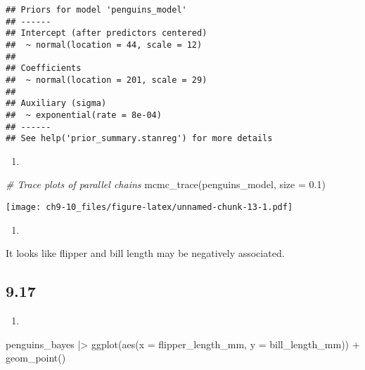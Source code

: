 \documentclass[
]{article}
\newenvironment{Shaded}{\begin{snugshade}}{\end{snugshade}}
\newcommand{\AttributeTok}[1]{\textcolor[rgb]{0.77,0.63,0.00}{#1}}
\newcommand{\CommentTok}[1]{\textcolor[rgb]{0.56,0.35,0.01}{\textit{#1}}}
\newcommand{\FloatTok}[1]{\textcolor[rgb]{0.00,0.00,0.81}{#1}}
\newcommand{\FunctionTok}[1]{\textcolor[rgb]{0.00,0.00,0.00}{#1}}
\newcommand{\NormalTok}[1]{#1}
\newcommand{\SpecialCharTok}[1]{\textcolor[rgb]{0.00,0.00,0.00}{#1}}
\providecommand{\tightlist}{%
  \setlength{\itemsep}{0pt}\setlength{\parskip}{0pt}}
\begin{document}
\begin{verbatim}
## Priors for model 'penguins_model' 
## ------
## Intercept (after predictors centered)
##  ~ normal(location = 44, scale = 12)
## 
## Coefficients
##  ~ normal(location = 201, scale = 29)
## 
## Auxiliary (sigma)
##  ~ exponential(rate = 8e-04)
## ------
## See help('prior_summary.stanreg') for more details
\end{verbatim}

\begin{enumerate}
\def\labelenumi{\alph{enumi}.}
\setcounter{enumi}{2}
\tightlist
\item
\end{enumerate}

\begin{Shaded}
\begin{Highlighting}[]
\CommentTok{\# Trace plots of parallel chains}
\FunctionTok{mcmc\_trace}\NormalTok{(penguins\_model, }\AttributeTok{size =} \FloatTok{0.1}\NormalTok{)}
\end{Highlighting}
\end{Shaded}

\texttt{[image: ch9-10\_files/figure-latex/unnamed-chunk-13-1.pdf]}

\begin{enumerate}
\def\labelenumi{\alph{enumi}.}
\setcounter{enumi}{3}
\tightlist
\item
\end{enumerate}

It looks like flipper and bill length may be negatively associated.

\hypertarget{section-5}{%
\subsection{9.17}\label{section-5}}

\begin{enumerate}
\def\labelenumi{\alph{enumi}.}
\tightlist
\item
\end{enumerate}

\begin{Shaded}
\begin{Highlighting}[]
\NormalTok{penguins\_bayes }\SpecialCharTok{|\textgreater{}}
  \FunctionTok{ggplot}\NormalTok{(}\FunctionTok{aes}\NormalTok{(}\AttributeTok{x =}\NormalTok{ flipper\_length\_mm, }\AttributeTok{y =}\NormalTok{ bill\_length\_mm)) }\SpecialCharTok{+}
  \FunctionTok{geom\_point}\NormalTok{()}
\end{Highlighting}
\end{Shaded}
\end{document}
